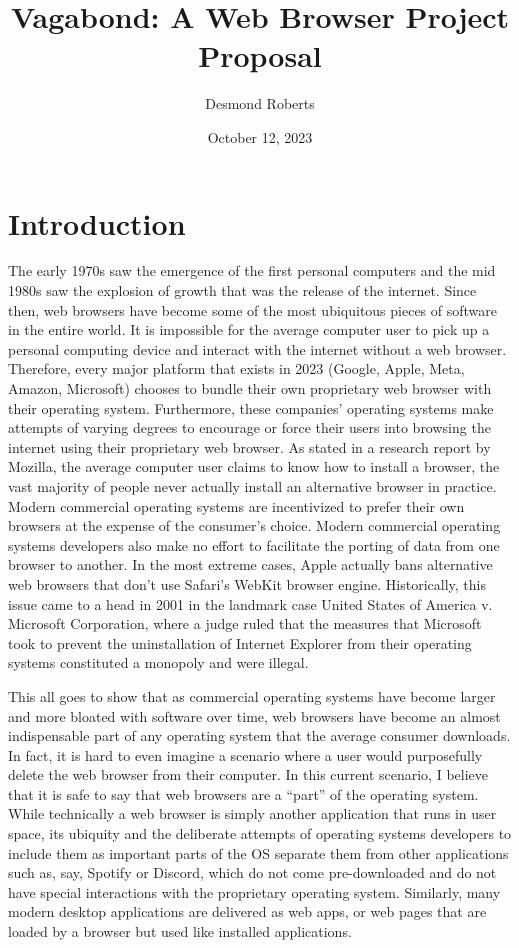 \documentclass[12pt]{article}
\title{Vagabond: A Web Browser Project Proposal}
\author{Desmond Roberts}
\date{October 12, 2023}
\begin{document}
\twocolumn

\maketitle

\section{Introduction}

The early 1970s saw the emergence of the first personal computers and the mid 1980s saw the explosion of growth that was the release of the internet.  Since then, web browsers have become some of the most ubiquitous pieces of software in the entire world.  It is impossible for the average computer user to pick up a personal computing device and interact with the internet without a web browser.  Therefore, every major platform that exists in 2023 (Google, Apple, Meta, Amazon, Microsoft) chooses to bundle their own proprietary web browser with their operating system.
Furthermore, these companies’ operating systems make attempts of varying degrees to encourage or force their users into browsing the internet using their proprietary web browser.  As stated in a research report by Mozilla, the average computer user claims to know how to install a browser, the vast majority of people never actually install an alternative browser in practice.  Modern commercial operating systems are incentivized to prefer their own browsers at the expense of the consumer's choice.  Modern commercial operating systems developers also make no effort to facilitate the porting of data from one browser to another.  In the most extreme cases, Apple actually bans alternative web browsers that don’t use Safari’s WebKit browser engine.  Historically, this issue came to a head in 2001 in the landmark case United States of America v. Microsoft Corporation, where a judge ruled that the measures that Microsoft took to prevent the uninstallation of Internet Explorer from their operating systems constituted a monopoly and were illegal.

This all goes to show that as commercial operating systems have become larger and more bloated with software over time, web browsers have become an almost indispensable part of any operating system that the average consumer downloads.  In fact, it is hard to even imagine a scenario where a user would purposefully delete the web browser from their computer.  In this current scenario, I believe that it is safe to say that web browsers are a “part” of the operating system. While technically a web browser is simply another application that runs in user space, its ubiquity and the deliberate attempts of operating systems developers to include them as important parts of the OS separate them from other applications such as, say, Spotify or Discord, which do not come pre-downloaded and do not have special interactions with the proprietary operating system.  Similarly, many modern desktop applications are delivered as web apps, or web pages that are loaded by a browser but used like installed applications.
\end{document}
